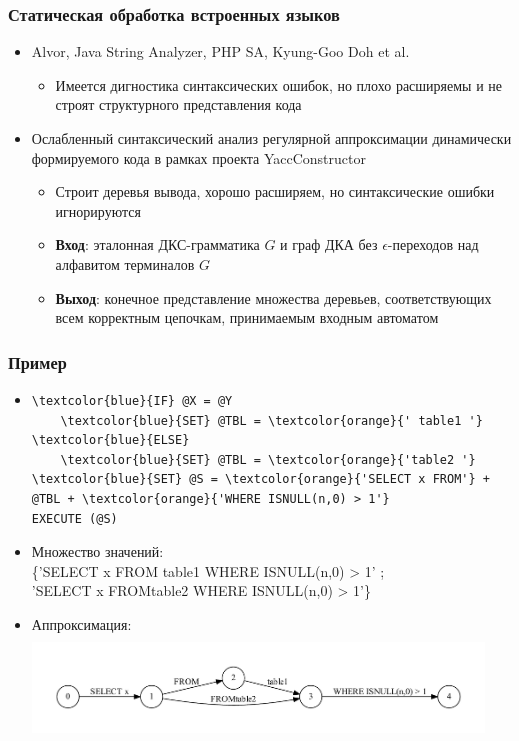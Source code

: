 \documentclass{beamer}
\begin{document}
            
\begin{frame}[fragile]
	\transwipe[direction=90]
	\frametitle{Статическая обработка встроенных языков}
	\begin{itemize}
	   \item Alvor, Java String Analyzer, PHP SA, Kyung-Goo Doh et al.
	    \begin{itemize}
	        \item Имеется дигностика синтаксических ошибок, но плохо расширяемы и не строят структурного представления кода
	    \end{itemize}
	   \item Ослабленный синтаксический анализ регулярной аппроксимации динамически формируемого кода в рамках проекта YaccConstructor
	    \begin{itemize}
	        \item Строит деревья вывода, хорошо расширяем, но синтаксические ошибки игнорируются
	        \item \textbf{Вход}: эталонная ДКС-грамматика $G$ и граф ДКА без 
$\epsilon$-переходов над алфавитом терминалов $G$
            \item \textbf{Выход}: конечное представление множества деревьев, соответствующих 
всем корректным цепочкам, принимаемым входным автоматом
	     \end{itemize}
    \end{itemize}
\end{frame}

\begin{frame}[fragile]
	\transwipe[direction=90]
	\frametitle{Пример}
		\begin{itemize}
	\item
\begin{Verbatim}[commandchars=\\\{\}]
\textcolor{blue}{IF} @X = @Y
    \textcolor{blue}{SET} @TBL = \textcolor{orange}{' table1 '}
\textcolor{blue}{ELSE}
    \textcolor{blue}{SET} @TBL = \textcolor{orange}{'table2 '}
\textcolor{blue}{SET} @S = \textcolor{orange}{'SELECT x FROM'} + @TBL + \textcolor{orange}{'WHERE ISNULL(n,0) > 1'}
EXECUTE (@S)
       \end{Verbatim}
     	\item Множество значений: \\ \{'SELECT x FROM table1 WHERE ISNULL(n,0) > 1' ; \\ \vspace{2pt} 'SELECT x FROMtable2 WHERE ISNULL(n,0) > 1'\}
    	\item Аппроксимация: 
                \includegraphics[width = 340pt,height=80pt]{pictures/SQLGraph.pdf}

	\end{itemize}

\end{frame}
\end{document}

